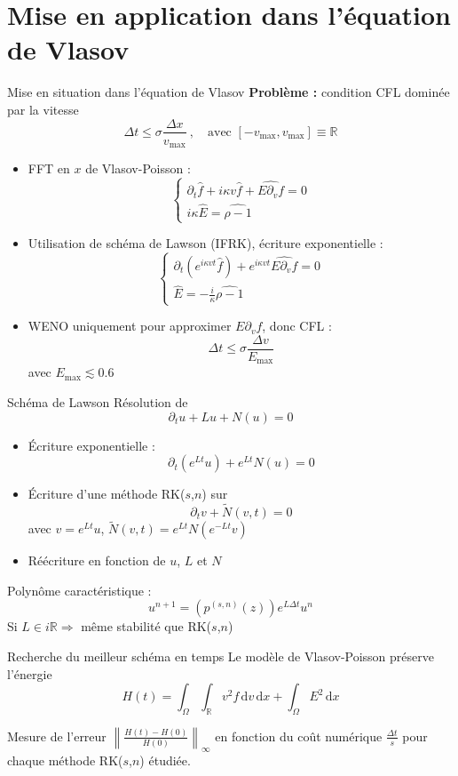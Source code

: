 \documentclass{beamer}
\begin{document}
\section{Mise en application dans l'équation de Vlasov}
\begin{frame}{Mise en situation dans l'équation de Vlasov}
  \textbf{Problème :} condition CFL dominée par la vitesse $$\Delta t \leq \sigma\frac{\Delta x}{v_{\text{max}}}\ ,\quad \text{avec } [-v_{\text{max}},v_{\text{max}} ] \equiv \mathbb{R}$$ 
  \begin{itemize}
    \item FFT en $x$ de Vlasov-Poisson : $$\begin{cases}\partial_t \hat{f} + i\kappa v\hat{f} + \widehat{E\partial_vf} = 0 \\ i\kappa \hat{E} = \widehat{\rho - 1} \end{cases}$$
    \item Utilisation de schéma de Lawson (IFRK), écriture exponentielle : $$\begin{cases}\partial_t(e^{i\kappa vt}\hat{f}) + e^{i\kappa vt}\widehat{E\partial_vf} = 0 \\ \hat{E}=-\frac{i}{\kappa}\widehat{\rho-1}\end{cases}$$
    \item WENO uniquement pour approximer $E\partial_v f$, donc CFL : $$\Delta t \leq \sigma \frac{\Delta v}{E_{\text{max}}}$$ avec $E_{\text{max}} \lesssim 0.6$
  \end{itemize}
\end{frame}

\begin{frame}{Schéma de Lawson}
  Résolution de $$\partial_tu + Lu + N(u) = 0$$

  \begin{itemize}
    \item Écriture exponentielle : $$\partial_t(e^{Lt}u) + e^{Lt}N(u) = 0$$
    \item Écriture d'une méthode RK($s$,$n$) sur $$\partial_t v + \tilde{N}(v,t) = 0$$ avec $v = e^{Lt}u$, $\tilde{N}(v,t) = e^{Lt}N(e^{-Lt}v)$
    \item Réécriture en fonction de $u$, $L$ et $N$
  \end{itemize}

  Polynôme caractéristique : $$u^{n+1} = \left(p^{(s,n)}(z)\right)e^{L\Delta t} u^n$$ Si $L\in i\mathbb{R} \Rightarrow$ même stabilité que RK($s$,$n$)
\end{frame}

\begin{frame}{Recherche du meilleur schéma en temps}
  Le modèle de Vlasov-Poisson préserve l'énergie $$H(t) = \int_\Omega\int_{\mathbb{R}} v^2f\,\mathrm{d}v\,\mathrm{d}x + \int_{\Omega}E^2\,\mathrm{d}x$$

  Mesure de l'erreur $\left\|\frac{H(t)-H(0)}{H(0)}\right\|_\infty$ en fonction du coût numérique $\frac{\Delta t}{s}$ pour chaque méthode RK($s$,$n$) étudiée.
\end{frame}
\end{document}
